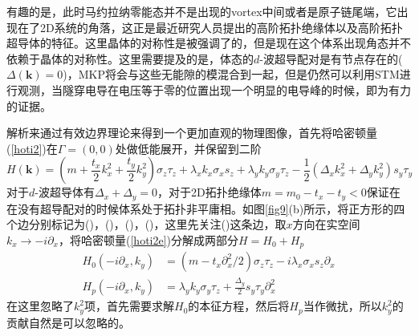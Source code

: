 有趣的是，此时马约拉纳零能态并不是出现的vortex中间或者是原子链尾端，它出现在了2D系统的角落，这正是最近研究人员提出的高阶拓扑绝缘体以及高阶拓扑超导体的特征。这里晶体的对称性是被强调了的，但是现在这个体系出现角态并不依赖于晶体的对称性。这里需要提及的是，体态的$d$-波超导配对是有节点存在的($\Delta(\mathbf{k})=0$)，MKP将会与这些无能隙的模混合到一起，但是仍然可以利用STM进行观测，当隧穿电导在电压等于零的位置出现一个明显的电导峰的时候，即为有力的证据。

\qquad 解析来通过有效边界理论来得到一个更加直观的物理图像，首先将哈密顿量(\ref{hoti2})在$\Gamma=(0,0)$处做低能展开，并保留到二阶
\begin{equation}
H(\mathbf{k})=(m+\frac{t_x}{2}k_x^2+\frac{t_y}{2}k_y^2)\sigma_z\tau_z+\lambda_xk_x\sigma_xs_z+\lambda_yk_y\sigma_y\tau_z-\frac{1}{2}(\Delta_xk_x^2+\Delta_yk_y^2)s_y\tau_y\label{hoti2e}
\end{equation}
对于$d$-波超导体有$\Delta_x+\Delta_y=0$，对于2D拓扑绝缘体$m=m_0-t_x-t_y<0$保证在在没有超导配对的时候体系处于拓扑非平庸相。如图\ref{fig9}(b)所示，将正方形的四个边分别标记为(\uppercase\expandafter{})，(\uppercase\expandafter{})，(\uppercase\expandafter{})，(\uppercase\expandafter{})，这里先关注(\uppercase\expandafter{})这条边，取$x$方向在实空间$k_x\rightarrow-i\partial_x$，将哈密顿量(\ref{hoti2e})分解成两部分$H=H_0+H_p$
\begin{equation}
\begin{aligned}
H_0(-i\partial_x,k_y)&=(m-t_x\partial_x^2/2)\sigma_z\tau_z-i\lambda_x\sigma_xs_z\partial_x\\
H_p(-i\partial_x,k_y)&=\lambda_yk_y\sigma_y\tau_z+\frac{\Delta_y}{2}s_y\tau_y\partial_x^2
\end{aligned}
\end{equation}
在这里忽略了$k_y^2$项，首先需要求解$H_0$的本征方程，然后将$H_p$当作微扰，所以$k_y^2$的贡献自然是可以忽略的。


